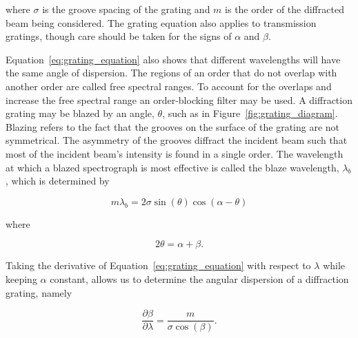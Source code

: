 \noindent where $\sigma$ is the groove spacing of the grating and $m$ is the order of the diffracted beam being considered. The grating equation also applies to transmission gratings, though care should be taken for the signs of $\alpha$ and $\beta$.
\prgph


Equation~\ref{eq:grating_equation} also shows that different wavelengths will have the same angle of dispersion. The regions of an order that do not overlap with another order are called free spectral ranges. To account for the overlaps and increase the free spectral range an order-blocking filter may be used. A diffraction grating may be blazed by an angle, $\theta$, such as in Figure~\ref{fig:grating_diagram}. Blazing refers to the fact that the grooves on the surface of the grating are not symmetrical. The asymmetry of the grooves diffract the incident beam such that most of the incident beam's intensity is found in a single order. The wavelength at which a blazed spectrograph is most effective is called the blaze wavelength, $\lambda_{b}$, which is determined by

\begin{equation}
  m\lambda_{b} = 2\sigma\sin(\theta)\cos(\alpha - \theta)
  \label{eq:blaze_wavelength}
\end{equation}

\noindent where

\begin{equation}
  2\theta = \alpha + \beta.
\end{equation}

Taking the derivative of Equation~\ref{eq:grating_equation} with respect to $\lambda$ while keeping $\alpha$ constant, allows us to determine the angular dispersion of a diffraction grating, namely

\begin{equation}
  \frac{\partial \beta}{\partial \lambda} = \frac{m}{\sigma \cos(\beta)}.
  \label{eq:grating_angular_dispersion}
\end{equation}


